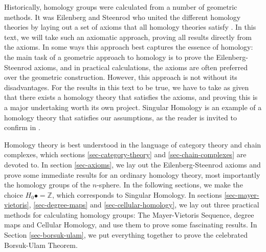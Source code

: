 Historically, homology groups were calculated from a number of geometric methods. It was Eilenberg and Steenrod who united the different homology theories by laying out a set of axioms that all homology theories satisfy \cite{Eilenberg}. In this text, we will take such an axiomatic approach, proving all results directly from the axioms. In some ways this approach best captures the essence of homology: the main task of a geometric approach to homology is to prove the Eilenberg-Steenrod axioms, and in practical calculations, the axioms are often preferred over the geometric construction. However, this approach is not without its disadvantages. For the results in this text to be true, we have to take as given that there exists a homology theory that satisfies the axioms, and proving this is a major undertaking worth its own project. Singular Homology is an example of a homology theory that satisfies our assumptions, as the reader is invited to confirm in \cite{Hatcher}.

Homology theory is best understood in the language of category theory and chain complexes, which sections \ref{sec-category-theory} and \ref{sec-chain-complexes} are devoted to. In section \ref{sec-axioms}, we lay out the Eilenberg-Steenrod axioms and prove some immediate results for an ordinary homology theory, most importantly the homology groups of the $n$-sphere. In the following sections, we make the choice $H_0 \bullet=\mathbb{Z}$, which corresponds to Singular Homology. In sections \ref{sec-mayer-vietoris}, \ref{sec-degree-maps} and \ref{sec-cellular-homology}, we lay out three practical methods for calculating homology groups: The Mayer-Vietoris Sequence, degree maps and Cellular Homology, and use them to prove some fascinating results. In Section \ref{sec-borsuk-ulam}, we put everything together to prove the celebrated Borsuk-Ulam Theorem.